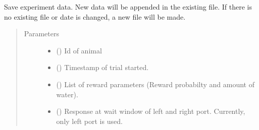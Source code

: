 \documentclass[letterpaper,10pt,english]{sphinxmanual}
\begin{document}
\begin{fulllineitems}
\begin{fulllineitems}
\label{\detokenize{NoSeMazeControl/Controllers:Controllers.ExperimentControl.ExperimentWorker.save_data}}
\pysigstartsignatures
{}
\pysigstopsignatures
\sphinxAtStartPar
Save experiment data. New data will be appended in the existing file.
If there is no existing file or date is changed, a new file will be
made.
\begin{quote}\begin{description}
\item[{Parameters}] \leavevmode\begin{itemize}
\item {} 
\sphinxAtStartPar
{} () \textendash{} Id of animal

\item {} 
\sphinxAtStartPar
{} () \textendash{} Timestamp of trial started.

\item {} 
\sphinxAtStartPar
{} () \textendash{} List of reward parameters (Reward probabilty and amount of water).

\item {} 
\sphinxAtStartPar
{} () \textendash{} Response at wait window of left and right port. Currently, only left
port is used.


\end{itemize}
\end{description}
\end{quote}
\end{fulllineitems}
\end{fulllineitems}
\end{document}
